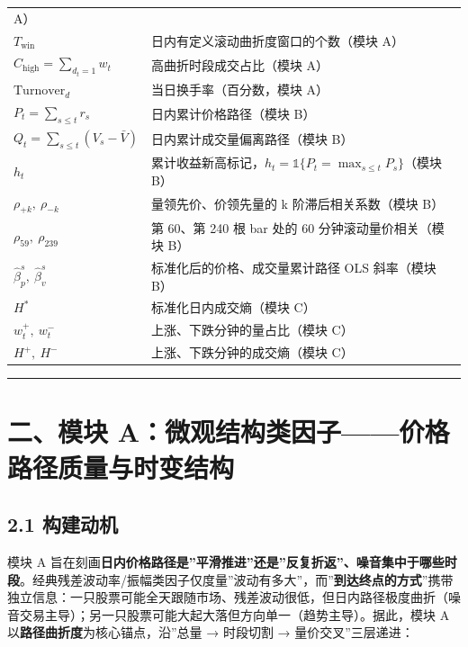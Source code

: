 \documentclass[UTF8,a4paper,zihao=-4,fontset=windows]{ctexart}
\begin{document}
\begin{longtable}[]{@{}
  >{\raggedright\arraybackslash}p{}
  >{\raggedright\arraybackslash}p{}@{}}
A） \\
\(T_{\mathrm{win}}\) & 日内有定义滚动曲折度窗口的个数（模块 A） \\
\(C_{\mathrm{high}}=\sum_{d_t=1}w_t\) & 高曲折时段成交占比（模块 A） \\
\(\mathrm{Turnover}_d\) & 当日换手率（百分数，模块 A） \\
\(P_t=\sum_{s\le t}r_s\) & 日内累计价格路径（模块 B） \\
\(Q_t=\sum_{s\le t}(V_s-\bar V)\) & 日内累计成交量偏离路径（模块 B） \\
\(h_t\) &
累计收益新高标记，\(h_t=\mathbb{1}\{P_t=\max_{s\le t}P_s\}\)（模块
B） \\
\(\rho_{+k},\ \rho_{-k}\) & 量领先价、价领先量的 k 阶滞后相关系数（模块
B） \\
\(\rho_{59},\ \rho_{239}\) & 第 60、第 240 根 bar 处的 60
分钟滚动量价相关（模块 B） \\
\(\hat\beta_p^s,\ \hat\beta_v^s\) & 标准化后的价格、成交量累计路径 OLS
斜率（模块 B） \\
\(H^*\) & 标准化日内成交熵（模块 C） \\
\(w_t^+,\ w_t^-\) & 上涨、下跌分钟的量占比（模块 C） \\
\(H^+,\ H^-\) & 上涨、下跌分钟的成交熵（模块 C） \\
\end{longtable}

\begin{center}\rule{0.5\linewidth}{0.5pt}\end{center}

\section{二、模块
A：微观结构类因子------价格路径质量与时变结构}\label{ux4e8cux6a21ux5757-aux5faeux89c2ux7ed3ux6784ux7c7bux56e0ux5b50ux4ef7ux683cux8defux5f84ux8d28ux91cfux4e0eux65f6ux53d8ux7ed3ux6784}

\subsection{2.1 构建动机}\label{ux6784ux5efaux52a8ux673a}

模块 A
旨在刻画\textbf{日内价格路径是''平滑推进''还是''反复折返''、噪音集中于哪些时段}。经典残差波动率/振幅类因子仅度量''波动有多大''，而''\textbf{到达终点的方式}''携带独立信息：一只股票可能全天跟随市场、残差波动很低，但日内路径极度曲折（噪音交易主导）；另一只股票可能大起大落但方向单一（趋势主导）。据此，模块
A 以\textbf{路径曲折度}为核心锚点，沿''总量 → 时段切割 →
量价交叉''三层递进：
\end{document}
